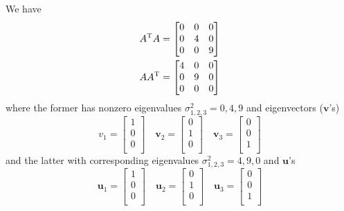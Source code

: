 \documentclass[a4paper]{article}
\begin{document}
We have 
\begin{align*}
	A^{\textsc{T}}A & =
	\begin{bmatrix}
		0 & 0 & 0 \\
		0 & 4 & 0 \\
		0 & 0 & 9 \\
	\end{bmatrix} \\
	AA^{\textsc{T}} & =
	\begin{bmatrix}
		4 & 0 & 0 \\
		0 & 9 & 0 \\
		0 & 0 & 0 \\
	\end{bmatrix} \\
\end{align*}
where the former has nonzero eigenvalues \(\sigma_{1,2,3}^{2} = 0, 4, 9\) and eigenvectors (\(\bm{v}\)'s)
\[
	v_{1} = 
	\begin{bmatrix}
		1 \\
		0 \\
		0 \\
	\end{bmatrix}
	\quad
	\bm{v}_{2} =
	\begin{bmatrix}
		0 \\
		1 \\
		0 \\
	\end{bmatrix}
	\quad
	\bm{v}_{3} =
	\begin{bmatrix}
		0 \\
		0 \\
		1 \\
	\end{bmatrix}
\]
and the latter with corresponding eigenvalues \(\sigma_{1,2,3}^{2} = 4, 9, 0\) and \(\bm{u}\)'s 
\[
	\bm{u}_{1} =
	\begin{bmatrix}
		1 \\
		0 \\
		0 \\
	\end{bmatrix}
	\quad
	\bm{u}_{2} = 
	\begin{bmatrix}
		0 \\
		1 \\
		0 \\
	\end{bmatrix}
	\quad
	\bm{u}_{3} = 
	\begin{bmatrix}
		0 \\
		0 \\
		1 \\
	\end{bmatrix}
\]
\end{document}
